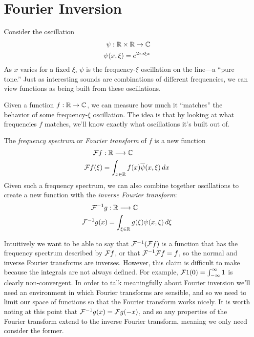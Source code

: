 
  \chapter{Fourier Inversion}

    Consider the oscillation
    \begin{align*}
      \psi:\mathbb{R}\times\mathbb{R}\rightarrow\mathbb{C}\\
      \psi(x,\xi) = e^{2\pi i \xi x}
    \end{align*}
    As $x$ varies for a fixed $\xi$, $\psi$ is the frequency-$\xi$ oscillation on the line---a ``pure tone.''
    Just as interesting sounds are combinations of different frequencies, we can view functions as being built from these oscillations. 

    Given a function $f:\mathbb{R}\rightarrow\mathbb{C}$, we can measure how much it ``matches'' the behavior of some frequency-$\xi$ oscillation.
    The idea is that by looking at what frequencies $f$ matches, we'll know exactly what oscillations it's built out of.
    \begin{defn}
      The \emph{frequency spectrum} or \emph{Fourier transform} of $f$ is a new function 
      \begin{align*}
        \mathcal{F} f&:\mathbb{R}\longrightarrow\mathbb{C}\\
        \mathcal{F} f(\xi) &= \int_{x\in\mathbb{R}} f(x)\overline\psi(x,\xi)\,dx
      \end{align*}
      Given such a frequency spectrum, we can also combine together oscillations to create a new function with the \emph{inverse Fourier transform}:
      \begin{align*}
        \mathcal{F}^{-1}g&:\mathbb{R}\longrightarrow\mathbb{C}\\
        \mathcal{F}^{-1}g(x) &= \int_{\xi\in\mathbb{R}} g(\xi)\psi(x,\xi)\,d\xi
      \end{align*}
      \vspace{-15pt}
    \end{defn}

    Intuitively we want to be able to say that $\mathcal{F}^{-1}(\mathcal{F} f)$ is a function that has the frequency spectrum described by $\mathcal{F} f$, or that $\mathcal{F}^{-1}\mathcal{F} f = f$, so the normal and inverse Fourier transforms are inverses.
    However, this claim is difficult to make because the integrals are not always defined.
    For example, $\mathcal{F}1(0)=\int_{-\infty}^\infty1$ is clearly non-convergent.
    In order to talk meaningfully about Fourier inversion we'll need an environment in which Fourier transforms are sensible, and so we need to limit our space of functions so that the Fourier transform works nicely.
    It is worth noting at this point that $\mathcal{F}^{-1}g(x) = \mathcal{F} g(-x)$, and so any properties of the Fourier transform extend to the inverse Fourier transform, meaning we only need consider the former.

